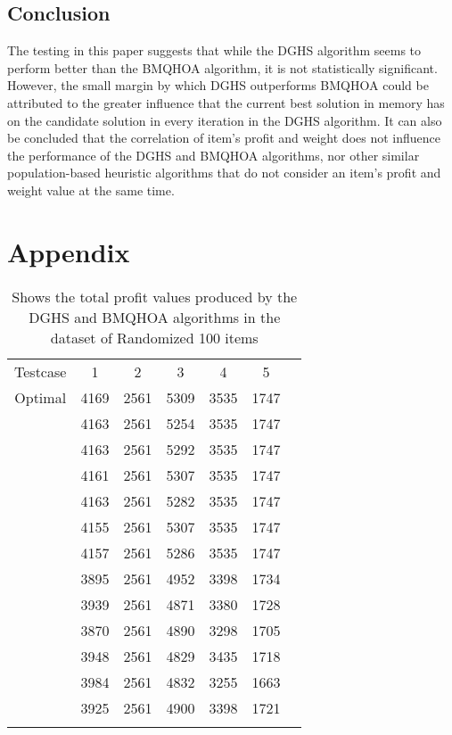 \documentclass[titlepage]{article}
\begin{document}
\subsection{Conclusion}
The testing in this paper suggests that while the DGHS algorithm seems to perform better than the BMQHOA algorithm, it is not statistically significant. However, the small margin by which DGHS outperforms BMQHOA could be attributed to the greater influence that the current best solution in memory has on the candidate solution in every iteration in the DGHS algorithm. It can also be concluded that the correlation of item's profit and weight does not influence the performance of the DGHS and BMQHOA algorithms, nor other similar population-based heuristic algorithms that do not consider an item's profit and weight value at the same time.  

\newpage





\section{Appendix}
\begin{table}[!h]\centering
    \caption{\scriptsize Shows the total profit values produced by the DGHS and BMQHOA algorithms in the dataset of Randomized 100 items} \label{random100}
    \begin{tabu}{|c|c|c|c|c|c|c|}
        Testcase & 1 & 2 & 3 & 4 & 5 \\ [-1pt]  
        Optimal & 4169 & 2561 & 5309 & 3535 & 1747 \\ [-1pt]  
         & 4163 & 2561 & 5254 & 3535 & 1747 \\ 
        & 4163 & 2561 &5292 &3535 &1747 \\  
        &4161 &2561 &5307 &3535 &1747 \\  
        &4163 &2561 &5282 &3535 &1747 \\  
        &4155 &2561 &5307 &3535 &1747 \\  
        &4157 &2561 &5286 &3535 &1747 \\[-1pt] 
         &3895 &2561 &4952 &3398 &1734 \\ 
        &3939 &2561 &4871 &3380 &1728 \\ 
        &3870 &2561 &4890 &3298 &1705 \\ 
        &3948 &2561 &4829 &3435 &1718 \\ 
        &3984 &2561 &4832 &3255 &1663 \\ 
        &3925 &2561 &4900 &3398 &1721 \\[-1pt] 
    \end{tabu}
\end{table}
\end{document}

